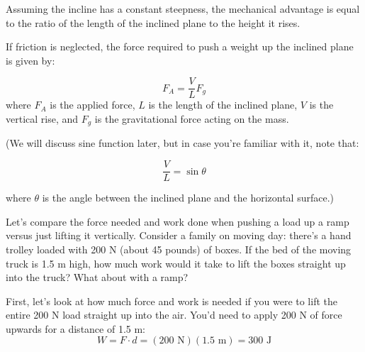 Assuming the incline has a constant steepness, the mechanical advantage is 
equal to the ratio of the length of the inclined plane to the height it rises. 

If friction is neglected, the force required to push a weight up the inclined 
plane is given by:

\[
F_A = \frac{V}{L} F_g
\]
where \( F_A \) is the applied force, \( L \) is the length of the inclined plane, \( V \) is the vertical rise, and \( F_g \) is the gravitational force acting on the mass.

\begin{center}
\end{center}

(We will discuss sine function later, but in case you're familiar with it, note that:

\[
\frac{V}{L} = \sin{\theta}
\]

where \( \theta \) is the angle between the inclined plane and the horizontal surface.)

Let's compare the force needed and work done when pushing a load up a ramp 
versus just lifting it vertically. Consider a family on moving day: there's a 
hand trolley loaded with 200 N (about 45 pounds) of boxes. If the bed of the 
moving truck is 1.5 m high, how much work would it take to lift the boxes 
straight up into the truck? What about with a ramp? 

First, let's look at how much force and work is needed if you were to lift the 
entire 200 N load straight up into the air. You'd need to apply 200 N of force 
upwards for a distance of 1.5 m:
$$W = F \cdot d = \left( 200 \text{ N} \right) \left( 1.5 \text{ m} \right) = 300 \text{ J}$$

